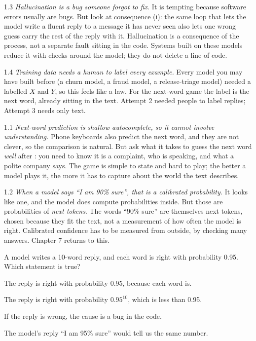 \begin{wrongidea}{1.3}
\emph{Hallucination is a bug someone forgot to fix.} It is tempting because software errors usually are bugs.
But look at consequence (i): the same loop that lets the model write a fluent reply to a message it has never
seen also lets one wrong guess carry the rest of the reply with it. Hallucination is a consequence of the process, not a
separate fault sitting in the code. Systems built on these models reduce it with
checks around the model; they do not delete a line of code.
\end{wrongidea}

\begin{wrongidea}{1.4}
\emph{Training data needs a human to label every example.} Every model you may have built before (a churn
model, a fraud model, a release-triage model) needed a labelled $X$ and $Y$, so this feels like a law. For the
next-word game the label is the next word, already sitting in the text. Attempt 2 needed people to label
replies; Attempt 3 needs only text.
\end{wrongidea}

\begin{wrongidea}{1.1}
\emph{Next-word prediction is shallow autocomplete, so it cannot involve understanding.} Phone keyboards also
predict the next word, and they are not clever, so the comparison is natural. But ask what it takes to guess
the next word \emph{well} after : you need to know it is a complaint, who is speaking, and
what a polite company says. The game is simple to state and hard to play; the better a model plays it, the more
it has to capture about the world the text describes.
\end{wrongidea}

\begin{wrongidea}{1.2}
\emph{When a model says ``I am 90\% sure'', that is a calibrated probability.} It looks like one, and the
model does compute probabilities inside. But those are probabilities of \emph{next tokens}. The words ``90\%
sure'' are themselves next tokens, chosen because they fit the text, not a measurement of how often the model
is right. Calibrated confidence has to be measured from outside, by checking many answers. Chapter 7 returns
to this.
\end{wrongidea}

\begin{checkq}
A model writes a 10-word reply, and each word is right with probability 0.95. Which statement is true?
\begin{options}
\item The reply is right with probability 0.95, because each word is.
\item The reply is right with probability $0.95^{10}$, which is less than 0.95.
\item If the reply is wrong, the cause is a bug in the code.
\item The model's reply ``I am 95\% sure'' would tell us the same number.
\end{options}
\end{checkq}

